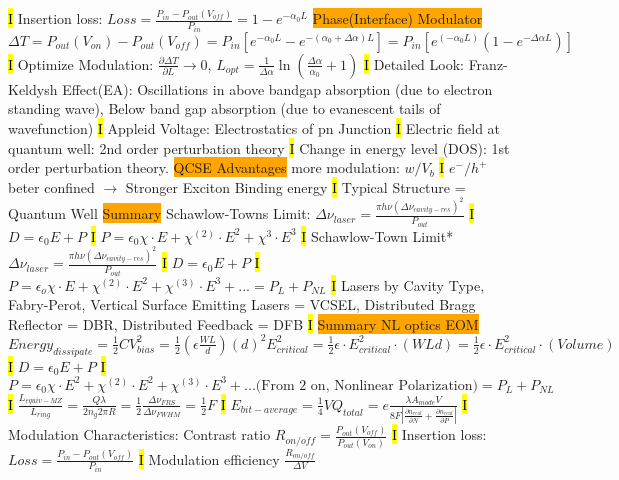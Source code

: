 \documentclass[fontsize=3]{scrartcl}
\begin{document}
\hl{I}
Insertion loss:
$Loss = \frac{P_{in} - P_{out}(V_{off}) }{P_{in}} = 1-e^{-\alpha_0 L}$
\colorbox{Orange}{Phase(Interface) Modulator}
$\Delta T = P_{out} (V_{on}) - P_{out}(V_{off}) = P_{in}[e^{-\alpha_0 L} - e^{-(\alpha_0 + \Delta \alpha)L} ] = P_{in}[e^{(-\alpha_0 L)} (1-e^{-\Delta \alpha L})]$
\hl{I}
Optimize Modulation: $\frac{\partial \Delta T}{\partial L} \rightarrow 0$, $L_{opt} = \frac{1}{\Delta \alpha} \ln(\frac{\Delta \alpha}{\alpha_0} + 1)$
\hl{I}
Detailed Look: Franz-Keldysh Effect(EA): Oscillations in above bandgap absorption (due to electron standing wave), Below band gap absorption (due to evanescent tails of wavefunction)
\hl{I}
Appleid Voltage: Electrostatics of pn Junction
\hl{I}
Electric field at quantum well: 2nd order perturbation theory
\hl{I}
Change in energy level (DOS): 1st order perturbation theory.
\colorbox{Orange}{QCSE Advantages}
more modulation: $w/V_b$
\hl{I}
$e^{-}/h^{+}$ beter confined $\rightarrow $ Stronger Exciton Binding energy
\hl{I}
Typical Structure = Quantum Well
\colorbox{Orange}{Summary}
Schawlow-Towns Limit: $\Delta \nu_{laser} = \frac{\pi h \nu (\Delta \nu_{cavity-res})^2}{P_{out}}$
\hl{I}
$D=\epsilon_0 E + P$
\hl{I}
$P = \epsilon_0 \chi \cdot E + \chi^{(2)} \cdot E^2 + \chi^{3} \cdot E^{3}$
\hl{I}
Schawlow-Town Limit* $\Delta \nu_{laser} = \frac{\pi h \nu (\Delta \nu_{cavity-res})^2}{P_{out}}$
\hl{I}
$D = \epsilon_0 E + P$
\hl{I}
$P = \epsilon_o \chi \cdot E + \chi^{(2)} \cdot E^2 + \chi^{(3)} \cdot E^{3} + ... = P_{L} + P_{NL}$
\hl{I}
Lasers by Cavity Type, Fabry-Perot, Vertical Surface Emitting Lasers = VCSEL, Distributed Bragg Reflector = DBR, Distributed Feedback = DFB
\hl{I}
\colorbox{Orange}{Summary NL optics EOM}
$Energy_{dissipate} = \frac{1}{2} CV_{bias}^{2} = \frac{1}{2}  (\epsilon \frac{WL}{d} ) (d)^2 E_{critical}^{2} = \frac{1}{2}\epsilon \cdot E_{critical}^{2} \cdot(WLd) = \frac{1}{2}\epsilon \cdot E_{critical}^{2} \cdot (Volume)$
\hl{I}
$D=\epsilon_0 E + P$
\hl{I}
$P = \epsilon_0 \chi \cdot E^2 + \chi^{(2)} \cdot E^2 + \chi^{(3)} \cdot E^3 + ... \text{(From 2 on, Nonlinear Polarization)} = P_L + P_{NL} $
\hl{I}
$\frac{L_{equiv-MZ}}{L_{ring}} = \frac{Q \lambda}{2n_g 2 \pi R} = \frac{1}{2}\frac{\Delta \nu_{FRS}}{\Delta \nu_{FWHM}} = \frac{1}{2}F$
\hl{I}
$E_{bit-average} = \frac{1}{4}VQ_{total} = e\frac{\lambda A_{mode} V}{8F|\frac{\partial n_{real}}{\partial N} + \frac{\partial n_{real}}{\partial P}|}$
\hl{I}
Modulation Characteristics: Contrast ratio $R_{on/off} = \frac{P_{out}(V_{off})}{P_{out}(V_{on})}$
\hl{I}
Insertion loss: $Loss = \frac{ P_{in} - P_{out}(V_{off}) }{P_{in}}$
\hl{I}
Modulation efficiency $\frac{R_{on/off}}{\Delta V}$
\end{document}
